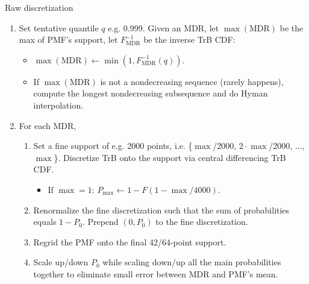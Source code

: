 \documentclass[aspectratio=169]{beamer}
\begin{document}
\begin{frame}{Raw discretization}
%

\begin{enumerate}

\item Set tentative quantile $q$ e.g. 0.999. Given an MDR, let $\max(\text{MDR})$ be the max of PMF's support, let $F^{-1}_{\text{MDR}}$ be the inverse TrB CDF:\medskip

\begin{itemize}
\item $\max(\text{MDR})\gets  \min\left(1, F^{-1}_{\text{MDR}}(q)\right)$.\medskip 

\item If $\max(\text{MDR})$ is not a nondecreasing sequence (rarely happens), compute the longest nondecreasing subsequence and do Hyman interpolation.\medskip\pause

\end{itemize}

\item For each MDR,\medskip

\tiny\begin{enumerate}
\item Set a fine support of e.g. 2000 points, i.e. \{$\max$/2000, $2\cdot\max$/2000, $\ldots$, $\max$\}. Discretize TrB onto the support via central differencing TrB CDF.\medskip

\begin{itemize}
\item If $\max=1$: $P_{\max}\gets1-F(1-\max/4000)$.\medskip
\end{itemize}


\item Renormalize the fine discretization such that the sum of probabilities equals $1-P_0$. Prepend $(0, P_0)$ to the fine discretization.\medskip\pause

\item Regrid the PMF onto the final 42/64-point support.\medskip\pause

\item Scale up/down $P_0$ while scaling down/up all the main probabilities together to eliminate small error between MDR and PMF's mean.

\end{enumerate}

\end{enumerate}

\end{frame}
\end{document}
